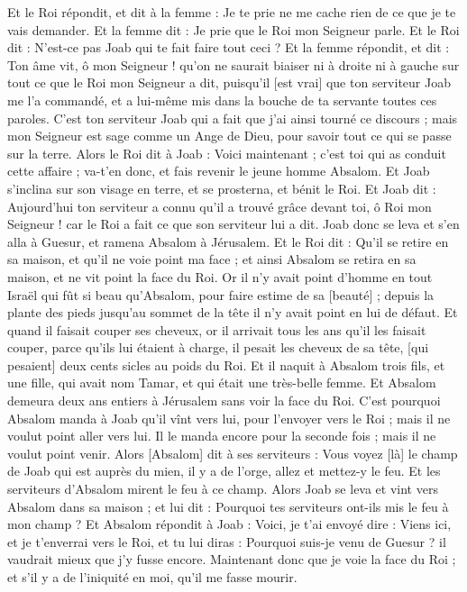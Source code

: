 \begin{multicols}{2}
Et le Roi répondit, et dit à la femme : Je te prie ne me cache rien de ce que je te vais demander. Et la femme dit : Je prie que le Roi mon Seigneur parle.
Et le Roi dit : N'est-ce pas Joab qui te fait faire tout ceci ? Et la femme répondit, et dit : Ton âme vit, ô mon Seigneur ! qu'on ne saurait biaiser ni à droite ni à gauche sur tout ce que le Roi mon Seigneur a dit, puisqu'il [est vrai] que ton serviteur Joab me l'a commandé, et a lui-même mis dans la bouche de ta servante toutes ces paroles.
C'est ton serviteur Joab qui a fait que j'ai ainsi tourné ce discours ; mais mon Seigneur est sage comme un Ange de Dieu, pour savoir tout ce qui se passe sur la terre.
Alors le Roi dit à Joab : Voici maintenant ; c'est toi qui as conduit cette affaire ; va-t'en donc, et fais revenir le jeune homme Absalom.
Et Joab s'inclina sur son visage en terre, et se prosterna, et bénit le Roi. Et Joab dit : Aujourd'hui ton serviteur a connu qu'il a trouvé grâce devant toi, ô Roi mon Seigneur ! car le Roi a fait ce que son serviteur lui a dit.
Joab donc se leva et s'en alla à Guesur, et ramena Absalom à Jérusalem.
Et le Roi dit : Qu'il se retire en sa maison, et qu'il ne voie point ma face ; et ainsi Absalom se retira en sa maison, et ne vit point la face du Roi.
Or il n'y avait point d'homme en tout Israël qui fût si beau qu'Absalom, pour faire estime de sa [beauté] ; depuis la plante des pieds jusqu'au sommet de la tête il n'y avait point en lui de défaut.
Et quand il faisait couper ses cheveux, or il arrivait tous les ans qu'il les faisait couper, parce qu'ils lui étaient à charge, il pesait les cheveux de sa tête, [qui pesaient] deux cents sicles au poids du Roi.
Et il naquit à Absalom trois fils, et une fille, qui avait nom Tamar, et qui était une très-belle femme.
Et Absalom demeura deux ans entiers à Jérusalem sans voir la face du Roi.
C'est pourquoi Absalom manda à Joab qu'il vînt vers lui, pour l'envoyer vers le Roi ; mais il ne voulut point aller vers lui. Il le manda encore pour la seconde fois ; mais il ne voulut point venir.
Alors [Absalom] dit à ses serviteurs : Vous voyez [là] le champ de Joab qui est auprès du mien, il y a de l'orge, allez et mettez-y le feu. Et les serviteurs d'Absalom mirent le feu à ce champ.
Alors Joab se leva et vint vers Absalom dans sa maison ; et lui dit : Pourquoi tes serviteurs ont-ils mis le feu à mon champ ?
Et Absalom répondit à Joab : Voici, je t'ai envoyé dire : Viens ici, et je t'enverrai vers le Roi, et tu lui diras : Pourquoi suis-je venu de Guesur ? il vaudrait mieux que j'y fusse encore. Maintenant donc que je voie la face du Roi ; et s'il y a de l'iniquité en moi, qu'il me fasse mourir.

\end{multicols}
